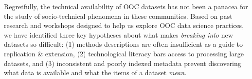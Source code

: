 Regretfully, the technical availability of OOC datasets has not been a panacea for the study of socio-technical phenomena in these communities.  Based on past research and workshops designed to help us explore OOC data science practices, we have identified three key hypotheses about what makes \emph{breaking into} new datasets so difficult: (1) methods descriptions are often insufficient as a guide to replication \& extension, (2) technological literacy bars access to processing large datasets, and (3) inconsistent and poorly indexed metadata prevent discovering what data is available and what the items of a dataset \emph{mean}.
